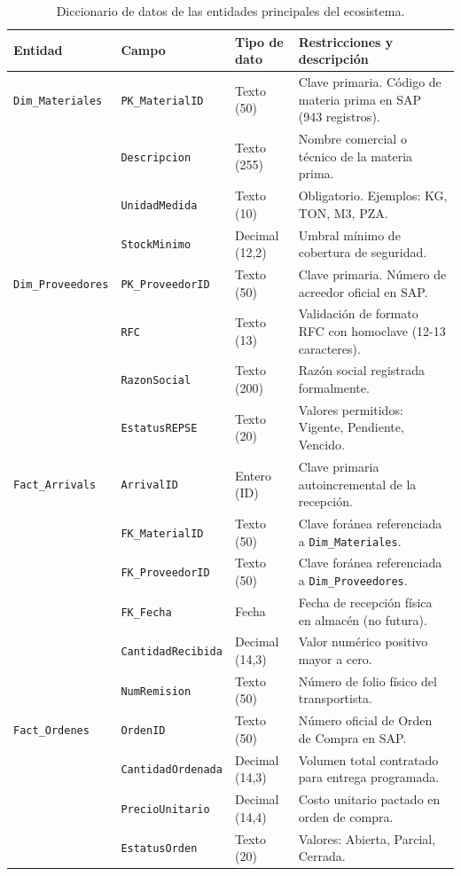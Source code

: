 \begin{table}[H]
  \centering
  \caption{Diccionario de datos de las entidades principales del ecosistema.}
  \label{tab:diccionario_datos}
  \footnotesize
  \begin{tabular}{@{}L{2.8cm}L{3.4cm}L{2.3cm}L{6.7cm}@{}}
    \toprule
    \textbf{Entidad} & \textbf{Campo} & \textbf{Tipo de dato} & \textbf{Restricciones y descripción} \\
    \midrule
    \texttt{Dim\_Materiales} & \texttt{PK\_MaterialID} & Texto (50) & Clave primaria. Código de materia prima en SAP (943 registros). \\
    & \texttt{Descripcion} & Texto (255) & Nombre comercial o técnico de la materia prima. \\
    & \texttt{UnidadMedida} & Texto (10) & Obligatorio. Ejemplos: KG, TON, M3, PZA. \\
    & \texttt{StockMinimo} & Decimal (12,2) & Umbral mínimo de cobertura de seguridad. \\
    \midrule
    \texttt{Dim\_Proveedores} & \texttt{PK\_ProveedorID} & Texto (50) & Clave primaria. Número de acreedor oficial en SAP. \\
    & \texttt{RFC} & Texto (13) & Validación de formato RFC con homoclave (12-13 caracteres). \\
    & \texttt{RazonSocial} & Texto (200) & Razón social registrada formalmente. \\
    & \texttt{EstatusREPSE} & Texto (20) & Valores permitidos: Vigente, Pendiente, Vencido. \\
    \midrule
    \texttt{Fact\_Arrivals} & \texttt{ArrivalID} & Entero (ID) & Clave primaria autoincremental de la recepción. \\
    & \texttt{FK\_MaterialID} & Texto (50) & Clave foránea referenciada a \texttt{Dim\_Materiales}. \\
    & \texttt{FK\_ProveedorID} & Texto (50) & Clave foránea referenciada a \texttt{Dim\_Proveedores}. \\
    & \texttt{FK\_Fecha} & Fecha & Fecha de recepción física en almacén (no futura). \\
    & \texttt{CantidadRecibida} & Decimal (14,3) & Valor numérico positivo mayor a cero. \\
    & \texttt{NumRemision} & Texto (50) & Número de folio físico del transportista. \\
    \midrule
    \texttt{Fact\_Ordenes} & \texttt{OrdenID} & Texto (50) & Número oficial de Orden de Compra en SAP. \\
    & \texttt{CantidadOrdenada} & Decimal (14,3) & Volumen total contratado para entrega programada. \\
    & \texttt{PrecioUnitario} & Decimal (14,4) & Costo unitario pactado en orden de compra. \\
    & \texttt{EstatusOrden} & Texto (20) & Valores: Abierta, Parcial, Cerrada. \\
    \bottomrule
  \end{tabular}
\end{table}

